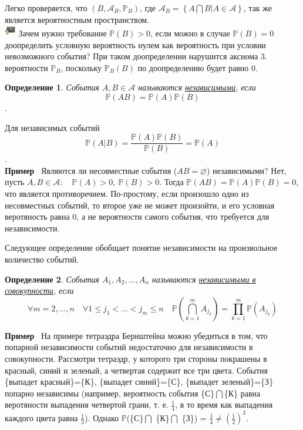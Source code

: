 \documentclass[12pt]{article}
\newtheorem{Def}{Определение}
\newenvironment{Ex}{{\bf Пример}\ }{}
\newenvironment{Wtf}{\includegraphics[height=5mm]{ping}}{}
\numberwithin{Th}{section}
\numberwithin{Def}{section}
\numberwithin{Lem}{section}
\numberwithin{St}{section}
\numberwithin{equation}{section}
\newcommand\Set[2]{\left\{ #1 | #2 \right\}}
\newcommand\Pro{\mathbb{P}}
\newcommand\Ev{\mathscr{A}}
\begin{document}
Легко проверяется, что $(B, \Ev_B, \Pro_B)$, где $\Ev_B = \Set{A \bigcap B}{A \in \Ev}$, так же является вероятностным пространством. \\
\begin{Wtf}
Зачем нужно требование $\Pro(B) > 0$, если можно в случае $\Pro(B) = 0$ доопределить условную вероятность нулем как вероятность при условии невозможного события?
При таком доопределении нарушится аксиома 3. вероятности $\Pro_B$, поскольку $\Pro_B(B)$ по доопределению будет равно $0$.
\end{Wtf}

\begin{Def}
События $A, B \in \Ev$ называются \underline{независимыми}, если $$\Pro(AB) = \Pro(A) \Pro(B)$$.
\end{Def}

Для независимых событий $$\Pro(A|B) = \frac{\Pro(A)\Pro(B)}{\Pro(B)} = \Pro(A)$$.\\
\begin{Ex}
Являются ли несовместные события ($AB = \varnothing$) независимыми? Нет, пусть  $A, B \in \Ev \colon \quad \Pro(A) > 0, \ \Pro(B) > 0$. Тогда $\Pro(AB) = \Pro(A)\Pro(B) = 0$, 
что является противоречием. По-простому, если произошло одно из несовместных событий, то второе уже не может произойти, и его условная веротяность равна 0, а не
вероятности самого события, что требуется для независимости.
\end{Ex}

Следующее определение обобщает понятие независимости на произвольное количество событий.
\begin{Def}
События $A_1, A_2, \dots, A_n$ называются \underline{независимыми в совокупности}, если 
$$\forall m = 2, \dots, n \quad \forall 1 \le j_1 < \ldots < j_m \le n \quad 
\Pro(\bigcap_{k=1}^{m}A_{j_k})=\prod_{k=1}^{m} \Pro(A_{j_k})$$
\end{Def}
\begin{Ex}
На примере тетраэдра Бернштейна можно убедиться в том, что попарной независимости событий недостаточно для независимости в совокупности. Рассмотри тетраэдр, у 
которого три стороны покрашены в красный, синий и зеленый, а четвертая содержит все три цвета. События \{выпадет красный\}=\{К\}, \{выпадет синий\}=\{С\}, \{выпадет зеленый\}=\{З\}
попарно независимы (например, вероятность события \{С\}$\bigcap$\{К\} равна веротяности выпадения четвертой грани, т. е. $\frac{1}{4}$, в то время как выпадения 
каждого цвета равна $\frac12$). Однако $\Pro$(\{С\}$\bigcap$ \{К\}$\bigcap$ \{З\}) = $\frac14 \not= (\frac12)^3$.
\end{Ex}
\end{document}
